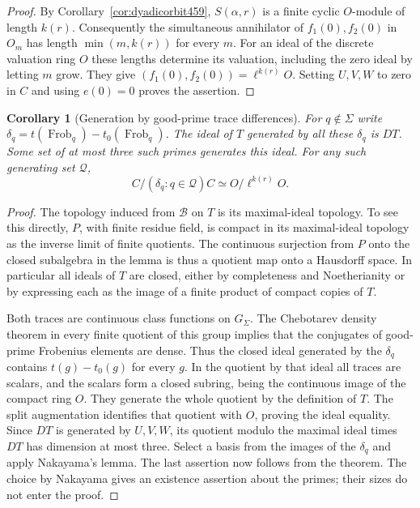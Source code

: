 \documentclass[a4paper,11pt]{article}
\newtheorem{corollary}[proposition]{Corollary}
\theoremstyle{definition}
\theoremstyle{remark}
\numberwithin{equation}{section}
\begin{document}
\begin{proof}
By Corollary~\ref{cor:dyadicorbit459}, \(S(\alpha,r)\) is a finite
cyclic \(O\)-module of length \(k(r)\). Consequently the simultaneous
annihilator of \(f_1(0),f_2(0)\) in \(O_m\) has length
\(\min(m,k(r))\) for every \(m\). For an ideal of the discrete valuation
ring \(O\) these lengths determine its valuation, including the zero
ideal by letting \(m\) grow. They give
\((f_1(0),f_2(0))=\ell^{k(r)}O\). Setting \(U,V,W\) to zero in \(C\)
and using \(e(0)=0\) proves the assertion.
\end{proof}

\begin{corollary}[Generation by good-prime trace differences]\leavevmode
\label{cor:frobideal470}
For \(q\notin\Sigma\) write \(\delta_q=t(\operatorname{Frob}_q)-
t_0(\operatorname{Frob}_q)\). The ideal of \(T\) generated by all
these \(\delta_q\) is \(DT\). Some set of at most three such primes
generates this ideal. For any such generating set \(\mathcal Q\),
\[
                  C/(\delta_q:q\in\mathcal Q)C
                      \simeq O/\ell^{k(r)}O .
\]
\end{corollary}
\begin{proof}
The topology induced from \(\mathcal B\) on \(T\) is its maximal-ideal
topology. To see this directly, \(P\), with finite residue field, is
compact in its maximal-ideal topology as the inverse limit of finite
quotients. The continuous surjection from \(P\) onto the closed
subalgebra in the lemma is thus a quotient map onto a Hausdorff
space. In particular all ideals of \(T\) are closed, either by
completeness and Noetherianity or by expressing each as the image
of a finite product of compact copies of \(T\).

Both traces are continuous class functions on \(G_\Sigma\). The
Chebotarev density theorem in every finite quotient of this group
implies that the conjugates of good-prime Frobenius elements are
dense. Thus the closed ideal generated by the \(\delta_q\) contains
\(t(g)-t_0(g)\) for every \(g\). In the quotient by that ideal all
traces are scalars, and the scalars form a closed subring, being
the continuous image of the compact ring \(O\). They generate the
whole quotient by the definition of \(T\). The split augmentation
identifies that quotient with \(O\), proving the ideal equality.
Since \(DT\) is generated by \(U,V,W\), its quotient modulo the
maximal ideal times \(DT\) has dimension at most three. Select a
basis from the images of the \(\delta_q\) and apply Nakayama's
lemma. The last assertion now follows from the theorem. The
choice by Nakayama gives an existence assertion about the primes;
their sizes do not enter the proof.
\end{proof}
\end{document}
